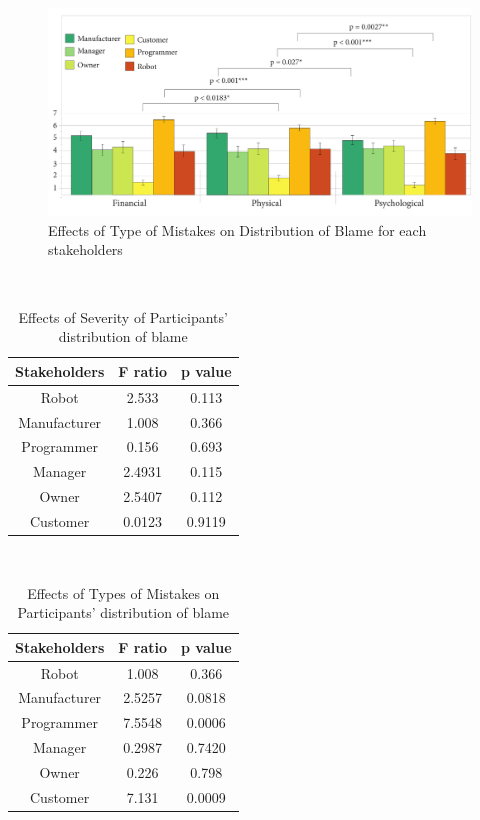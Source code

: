 \documentclass{sigchi}
\begin{document}
\begin{figure}[!tp]
\centering
\includegraphics[width=7.1in]{typeGraph}
\caption{Effects of Type of Mistakes on Distribution of Blame for each stakeholders}
\label{fig:figure5}
\vspace{-6pt}
\end{figure}


\hspace{1 mm} \\
\begin{table}[h]
  \centering
  \begin{tabular}{ccc}
    Stakeholders & F ratio & p value\\
    \hline
    Robot & 2.533 & 0.113\\
    Manufacturer & 1.008 & 0.366\\
    Programmer & 0.156 & 0.693 \\
    Manager & 2.4931 & 0.115 \\
    Owner & 2.5407 & 0.112 \\
    Customer & 0.0123 & 0.9119 \\
    \hline
  \end{tabular}
  \caption{Effects of Severity of Participants' distribution of blame}
  \label{tab:table2}
\end{table}

\hspace{1 mm} \\
\begin{table}[h]
  \centering
  \begin{tabular}{ccc}
    Stakeholders & F ratio & p value\\
    \hline
    Robot & 1.008 & 0.366\\
    Manufacturer & 2.5257 & 0.0818\\
    Programmer & 7.5548 & 0.0006 \\
    Manager & 0.2987 & 0.7420 \\
    Owner & 0.226 & 0.798 \\
    Customer & 7.131 & 0.0009 \\
    \hline
  \end{tabular}
  \caption{Effects of Types of Mistakes on Participants' distribution of blame}
  \label{tab:table2}
\end{table}
\end{document}
